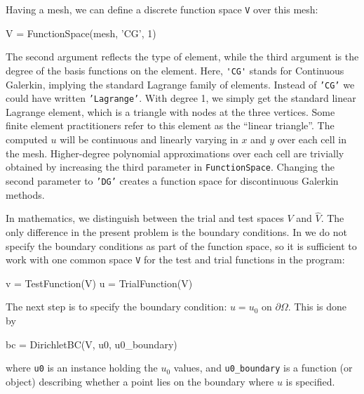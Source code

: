 Having a mesh, we can define a discrete function space {\fontsize{10pt}{10pt}\texttt{V}} over this mesh:
\begin{python}
V = FunctionSpace(mesh, 'CG', 1)
\end{python}
The second argument reflects the type of element, while the third
argument is the degree of the basis functions on the element.
Here, {\fontsize{10pt}{10pt}\verb!'CG'!} stands
for Continuous Galerkin, implying the 
standard Lagrange family of elements.
Instead of {\fontsize{10pt}{10pt}\texttt{'CG'}} we could have written {\fontsize{10pt}{10pt}\texttt{'Lagrange'}}.
With degree 1, we simply get the standard linear Lagrange element,
which is a triangle 
with nodes at the three vertices. 
Some finite element practitioners refer to this element as the
``linear triangle''.
The computed $u$ will be continuous and linearly varying in $x$ and $y$ over
each cell in the mesh.
Higher-degree polynomial approximations over each cell are
trivially obtained by increasing the third parameter in
{\fontsize{10pt}{10pt}\texttt{FunctionSpace}}. Changing the second parameter to {\fontsize{10pt}{10pt}\texttt{'DG'}} creates a
function space for discontinuous Galerkin methods.

In mathematics, we distinguish between the trial and test
spaces $V$ and $\hat{V}$. The only difference in the present problem
is the boundary conditions. In \fenics{} we do not specify the boundary
conditions as part of the function space, so it is sufficient to work
with one common space {\fontsize{10pt}{10pt}\verb!V!} for the test and trial functions in the
program:
\begin{python}
v = TestFunction(V)
u = TrialFunction(V)
\end{python}

The next step is to specify the boundary condition: $u=u_0$ on
$\partial\Omega$. This is done by
\begin{python}
bc = DirichletBC(V, u0, u0_boundary)
\end{python}
where {\fontsize{10pt}{10pt}\verb!u0!} is an instance holding the $u_0$ values,
and {\fontsize{10pt}{10pt}\verb!u0_boundary!} is a function (or object) describing whether a point lies
on the boundary where $u$ is specified. 

